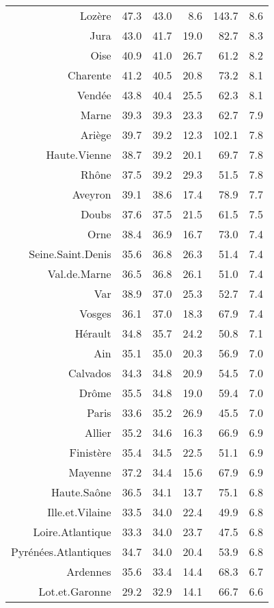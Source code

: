 \documentclass[11pt,a4paper]{article}\usepackage[]{graphicx}\usepackage[]{color}
\begin{document}
\begin{table}[H]
\begin{tabular}{rrrrrr}
  Lozère & 47.3 & 43.0 & 8.6 & 143.7 & 8.6 \\ 
  Jura & 43.0 & 41.7 & 19.0 & 82.7 & 8.3 \\ 
  Oise & 40.9 & 41.0 & 26.7 & 61.2 & 8.2 \\ 
  Charente & 41.2 & 40.5 & 20.8 & 73.2 & 8.1 \\ 
  Vendée & 43.8 & 40.4 & 25.5 & 62.3 & 8.1 \\ 
  Marne & 39.3 & 39.3 & 23.3 & 62.7 & 7.9 \\ 
  Ariège & 39.7 & 39.2 & 12.3 & 102.1 & 7.8 \\ 
  Haute.Vienne & 38.7 & 39.2 & 20.1 & 69.7 & 7.8 \\ 
  Rhône & 37.5 & 39.2 & 29.3 & 51.5 & 7.8 \\ 
  Aveyron & 39.1 & 38.6 & 17.4 & 78.9 & 7.7 \\ 
  Doubs & 37.6 & 37.5 & 21.5 & 61.5 & 7.5 \\ 
  Orne & 38.4 & 36.9 & 16.7 & 73.0 & 7.4 \\ 
  Seine.Saint.Denis & 35.6 & 36.8 & 26.3 & 51.4 & 7.4 \\ 
  Val.de.Marne & 36.5 & 36.8 & 26.1 & 51.0 & 7.4 \\ 
  Var & 38.9 & 37.0 & 25.3 & 52.7 & 7.4 \\ 
  Vosges & 36.1 & 37.0 & 18.3 & 67.9 & 7.4 \\ 
  Hérault & 34.8 & 35.7 & 24.2 & 50.8 & 7.1 \\ 
  Ain & 35.1 & 35.0 & 20.3 & 56.9 & 7.0 \\ 
  Calvados & 34.3 & 34.8 & 20.9 & 54.5 & 7.0 \\ 
  Drôme & 35.5 & 34.8 & 19.0 & 59.4 & 7.0 \\ 
  Paris & 33.6 & 35.2 & 26.9 & 45.5 & 7.0 \\ 
  Allier & 35.2 & 34.6 & 16.3 & 66.9 & 6.9 \\ 
  Finistère & 35.4 & 34.5 & 22.5 & 51.1 & 6.9 \\ 
  Mayenne & 37.2 & 34.4 & 15.6 & 67.9 & 6.9 \\ 
  Haute.Saône & 36.5 & 34.1 & 13.7 & 75.1 & 6.8 \\ 
  Ille.et.Vilaine & 33.5 & 34.0 & 22.4 & 49.9 & 6.8 \\ 
  Loire.Atlantique & 33.3 & 34.0 & 23.7 & 47.5 & 6.8 \\ 
  Pyrénées.Atlantiques & 34.7 & 34.0 & 20.4 & 53.9 & 6.8 \\ 
  Ardennes & 35.6 & 33.4 & 14.4 & 68.3 & 6.7 \\ 
  Lot.et.Garonne & 29.2 & 32.9 & 14.1 & 66.7 & 6.6 \\ 
   \hline
\end{tabular}
\endgroup
\end{table}
\end{document}
